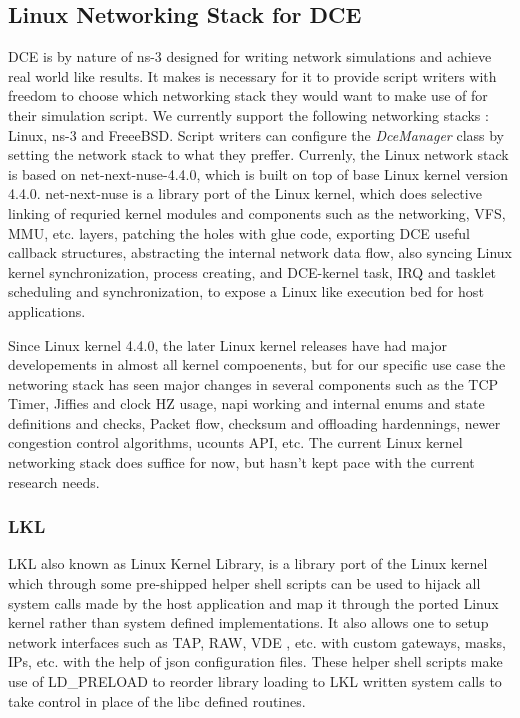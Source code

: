 \documentclass{sig-alternate}
\begin{document}
\subsection{Linux Networking Stack for DCE}
DCE is by nature of ns-3 designed for writing network simulations and achieve real world like results. It makes is necessary for it to provide script 
writers with freedom to choose which networking stack they would want to make use of for their simulation script. We currently support the following 
networking stacks : Linux, ns-3 and FreeeBSD. Script writers can configure the \textit{DceManager} class by setting the network stack to what they preffer.
Currenly, the Linux network stack is based on net-next-nuse-4.4.0, which is built on top of base Linux kernel version 4.4.0. net-next-nuse is a library 
port of the Linux kernel, which does selective linking of requried kernel modules and components such as the networking, VFS, MMU, etc. layers, patching 
the holes with glue code, exporting DCE useful callback structures, abstracting the internal network data flow, also syncing Linux kernel synchronization, 
process creating, and DCE-kernel task, IRQ and tasklet scheduling and synchronization, to expose a Linux like execution bed for host applications. 

Since Linux kernel 4.4.0, the later Linux kernel releases have had major developements in almost all kernel compoenents, but for our specific use case
the networing stack has seen major changes in several components such as the TCP Timer, Jiffies and clock HZ usage, napi working and internal enums 
and state definitions and checks, Packet flow, checksum and offloading hardennings, newer congestion control algorithms, ucounts API, etc. 
The current Linux kernel networking stack does suffice for now, but hasn't kept pace with the current research needs. 

\subsubsection{LKL}
LKL also known as Linux Kernel Library, is a library port of the Linux kernel which through some pre-shipped helper shell scripts can be used to hijack
all system calls made by the host application and map it through the ported Linux kernel rather than system defined implementations. It also allows one 
to setup network interfaces such as TAP, RAW, VDE , etc. with custom gateways, masks, IPs, etc. with the help of json configuration files. These helper
shell scripts make use of LD\_PRELOAD to reorder library loading to LKL written system calls to take control in place of the libc defined routines.
\end{document}
